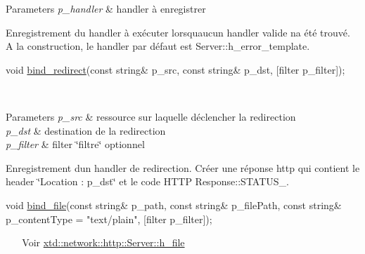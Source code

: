 \begin{DoxyItemize}
\begin{DoxyParams}{Parameters}
{\em p\+\_\+handler} & handler à enregistrer\\
\hline
\end{DoxyParams}
Enregistrement du handler à exécuter lorsqu\textquotesingle{}aucun handler valide n\textquotesingle{}a été trouvé. A la construction, le handler par défaut est Server\+::h\+\_\+error\+\_\+template. ~\newline
~\newline

\item 
\begin{DoxyCode}
\textcolor{keywordtype}{void} \hyperlink{classxtd_1_1network_1_1http_1_1Server_a08caadcbcc43f73a1f63364b5dfdbd6b}{bind\_redirect}(\textcolor{keyword}{const} \textcolor{keywordtype}{string}& p\_src, \textcolor{keyword}{const} \textcolor{keywordtype}{string}& p\_dst, [filter p\_filter]); 
\end{DoxyCode}
 ~\newline
~\newline
 
\begin{DoxyParams}{Parameters}
{\em p\+\_\+src} & ressource sur laquelle déclencher la redirection \\
\hline
{\em p\+\_\+dst} & destination de la redirection \\
\hline
{\em p\+\_\+filter} & filter \char`\"{}filtre\char`\"{} optionnel\\
\hline
\end{DoxyParams}
Enregistrement d\textquotesingle{}un handler de redirection. Créer une réponse http qui contient le header \char`\"{}\+Location \+: p\+\_\+dst\char`\"{} et le code H\+T\+TP Response\+::\+S\+T\+A\+T\+U\+S\+\_. ~\newline
~\newline

\item 
\begin{DoxyCode}
\textcolor{keywordtype}{void} \hyperlink{classxtd_1_1network_1_1http_1_1Server_ad3788397b3bd576b156823267d377dcc}{bind\_file}(\textcolor{keyword}{const} \textcolor{keywordtype}{string}& p\_path,
               \textcolor{keyword}{const} \textcolor{keywordtype}{string}& p\_filePath,
               \textcolor{keyword}{const} \textcolor{keywordtype}{string}& p\_contentType = \textcolor{stringliteral}{"text/plain"},
               [filter            p\_filter]);
\end{DoxyCode}
 ~\newline
~\newline
 Voir \hyperlink{classxtd_1_1network_1_1http_1_1Server_ab3525557fb71fe7ffec9bf68b61db107}{xtd\+::network\+::http\+::\+Server\+::h\+\_\+file} ~\newline
~\newline


\end{DoxyItemize}
